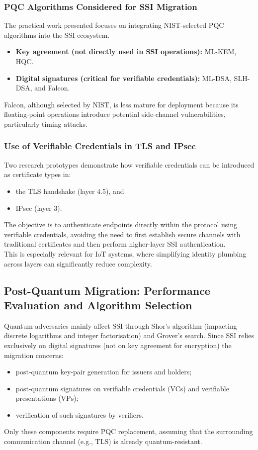 \subsubsection*{PQC Algorithms Considered for SSI Migration}
The practical work presented focuses on integrating NIST-selected PQC algorithms into the SSI ecosystem.

\begin{itemize}
    \item \textbf{Key agreement (not directly used in SSI operations):} ML-KEM, HQC.
    \item \textbf{Digital signatures (critical for verifiable credentials):} ML-DSA, SLH-DSA, and Falcon.
\end{itemize}

\noindent
Falcon, although selected by NIST, is less mature for deployment because its floating-point operations introduce potential side-channel vulnerabilities, particularly timing attacks.

\subsubsection*{Use of Verifiable Credentials in TLS and IPsec}
Two research prototypes demonstrate how verifiable credentials can be introduced as certificate types in:
\begin{itemize}
    \item the TLS handshake (layer 4.5), and
    \item IPsec (layer 3).
\end{itemize}

\noindent
The objective is to authenticate endpoints directly within the protocol using verifiable credentials, avoiding the need to first establish secure channels with traditional certificates and then perform higher-layer SSI authentication.\\ 
This is especially relevant for IoT systems, where simplifying identity plumbing across layers can significantly reduce complexity.


\subsection{Post-Quantum Migration: Performance Evaluation and Algorithm Selection}

Quantum adversaries mainly affect SSI through Shor’s algorithm (impacting discrete logarithms and integer factorisation) and Grover’s search. Since SSI relies exclusively on digital signatures (not on key agreement for encryption) the migration concerns:
\begin{itemize}
    \item post-quantum key-pair generation for issuers and holders;
    \item post-quantum signatures on verifiable credentials (VCs) and verifiable presentations (VPs);
    \item verification of such signatures by verifiers.
\end{itemize}
Only these components require PQC replacement, assuming that the surrounding communication channel (e.g., TLS) is already quantum-resistant.

